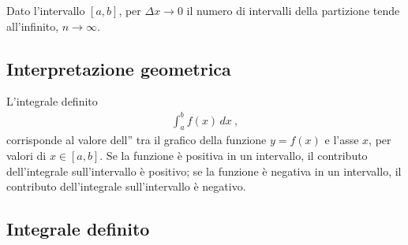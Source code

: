 \documentclass[letterpaper,10pt,italian]{jupyterBook}
\begin{document}
\sphinxAtStartPar
{} Dato l’intervallo \([a,b]\), per \(\Delta x \rightarrow 0\) il numero di intervalli della partizione tende all’infinito, \(n \rightarrow \infty\).


\subsection{Interpretazione geometrica}
\label{\detokenize{ch/infinitesimal_calculus/integrals:interpretazione-geometrica}}
\sphinxAtStartPar
L’integrale definito
\begin{equation*}
\begin{split}\int_{a}^{b} f(x) \, dx \ ,\end{split}
\end{equation*}
\sphinxAtStartPar
corrisponde al valore dell” tra il grafico della funzione \(y=f(x)\) e l’asse \(x\), per valori di \(x \in [a,b]\). Se la funzione è positiva in un intervallo, il contributo dell’integrale sull’intervallo è positivo; se la funzione è negativa in un intervallo, il contributo dell’integrale sull’intervallo è negativo.


\subsection{Integrale definito}
\label{\detokenize{ch/infinitesimal_calculus/integrals:integrale-definito}}\label{\detokenize{ch/infinitesimal_calculus/integrals:infinitesimal-calculus-integrals-def-definite}}
\end{document}
